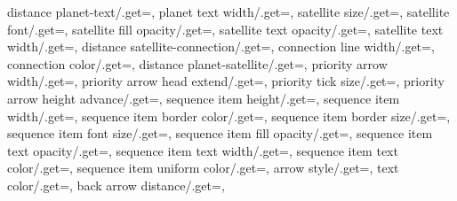 {{   distance planet-text/.get=\sm@core@planetinnersep,
   planet text width/.get=\sm@core@planettextwidth,
   satellite size/.get=\sm@core@satelliteminimumsize,
   satellite font/.get=\sm@core@satellitefont,
   satellite fill opacity/.get=\sm@core@satellitefillopacity,
   satellite text opacity/.get=\sm@core@satellitetextopacity,
   satellite text width/.get=\sm@core@satellitetextwidth,
   distance satellite-connection/.get=\sm@core@satelliteoutersep,
   connection line width/.get=\sm@core@connectionlinewidth,
   connection color/.get=\sm@core@connectioncolor,
   distance planet-satellite/.get=\sm@core@distanceplanetsatellite,
   priority arrow width/.get=\sm@core@priorityarrowwidth,
   priority arrow head extend/.get=\sm@core@priorityarrowheadextend,
   priority tick size/.get=\sm@core@prioritytick,
   priority arrow height advance/.get=\sm@core@priorityarrowheightadvance,
   sequence item height/.get=\sm@core@seqitemheight,
   sequence item width/.get=\sm@core@seqitemwidth,
   sequence item border color/.get=\sm@core@seqitembordercolor,
   sequence item border size/.get=\sm@core@seqlinewidth,
   sequence item font size/.get=\sm@core@seqitemfont,
   sequence item fill opacity/.get=\sm@core@seqitemfillopacity,
   sequence item text opacity/.get=\sm@core@seqitemtextopacity,
   sequence item text width/.get=\sm@core@seqitemtextwidth,
   sequence item text color/.get=\sm@core@seqitemtextcolor,
   sequence item uniform color/.get=\sm@core@seqitemuniformcol,
   arrow style/.get=\sm@core@arrowstyle,
   text color/.get=\sm@core@textcolor,
   back arrow distance/.get=\sm@core@backarrowdistance,
  }%
}%
%
%
%


